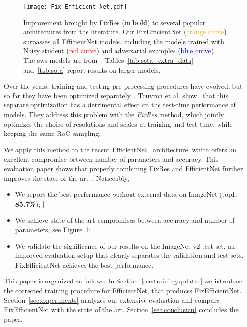 \documentclass{article}
\begin{document}
\begin{figure}[t]
\texttt{[image: Fix-Efficient-Net.pdf]}
\caption{\label{fig:FixEfficienNet}
Improvement brought by FixRes (in \textbf{bold}) to several popular architectures from the literature. 
Our FixEfficientNet (\textcolor{orange}{orange curve}) surpasses all EfficientNet models, including the models trained with Noisy student (\textcolor{red}{red curve}) and  adversarial examples (\textcolor{blue}{blue curve}).
The sws models are from~\cite{Yalniz2019BillionscaleSL}. 
Tables~\ref{tab:sota_extra_data} and~\ref{tab:sota} report results on larger models.
}
\end{figure}

Over the years, training and testing pre-processing procedures have evolved, but so far they have been optimized separately~\cite{Ekin2018AutoAugment}. 
Touvron et al. show~\cite{Touvron2019FixRes} that this separate optimization has a detrimental effect on the test-time performance of models.
They address this problem with the \emph{FixRes} method, which jointly optimizes the choice of resolutions and scales at training and test time, while keeping the same RoC sampling.

We apply this method to the recent EfficientNet~\cite{tan2019efficientnet} architecture, which offers an excellent compromise between number of parameters and accuracy. 
This evaluation paper shows that properly combining FixRes and EfficientNet further improves the state of the art~\cite{tan2019efficientnet}. 
Noticeably, 
\begin{itemize}
    \item We report the best performance without external data on ImageNet (top1: \textbf{85.7\%}); \-10pt]
    \item We achieve state-of-the-art compromises between accuracy and number of parameters, see Figure~\ref{fig:FixEfficienNet};  \-10pt]
    \item We validate the significance of our results on the ImageNet-v2 test set, an improved evaluation setup that clearly separates the validation and test sets. FixEfficientNet achieves the best performance. 
\end{itemize}

This paper is organized as follows. In Section~\ref{sec:trainingupdates} we introduce the corrected training procedure for EfficientNet, that produces FixEfficientNet. Section~\ref{sec:experiments} analyzes our extensive evaluation and compare FixEfficientNet with the state of the art. Section~\ref{sec:conclusion} concludes the paper. 
\end{document}

